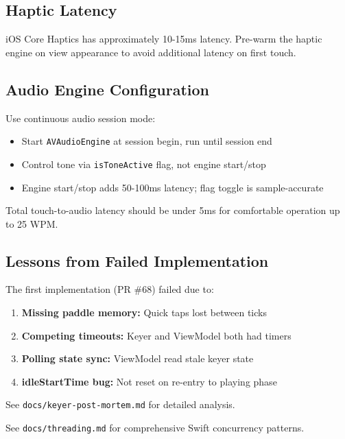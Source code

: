 \documentclass[a4paper,10pt,fleqn]{article}
\begin{document}
\subsection{Haptic Latency}

iOS Core Haptics has approximately 10-15ms latency. Pre-warm the haptic engine
on view appearance to avoid additional latency on first touch.

\subsection{Audio Engine Configuration}

Use continuous audio session mode:

\begin{itemize}
\item Start \texttt{AVAudioEngine} at session begin, run until session end
\item Control tone via \texttt{isToneActive} flag, not engine start/stop
\item Engine start/stop adds 50-100ms latency; flag toggle is sample-accurate
\end{itemize}

Total touch-to-audio latency should be under 5ms for comfortable operation up
to 25 WPM.

\subsection{Lessons from Failed Implementation}

The first implementation (PR \#68) failed due to:

\begin{enumerate}
\item \textbf{Missing paddle memory:} Quick taps lost between ticks
\item \textbf{Competing timeouts:} Keyer and ViewModel both had timers
\item \textbf{Polling state sync:} ViewModel read stale keyer state
\item \textbf{idleStartTime bug:} Not reset on re-entry to playing phase
\end{enumerate}

See \texttt{docs/keyer-post-mortem.md} for detailed analysis.

See \texttt{docs/threading.md} for comprehensive Swift concurrency patterns.
\end{document}

